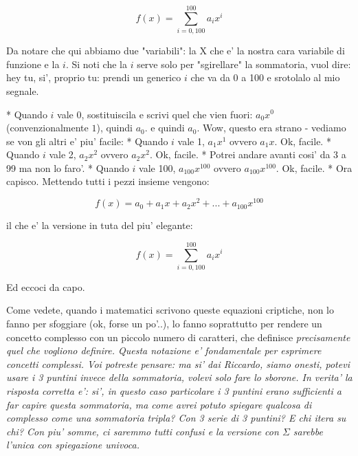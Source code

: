 \begin{equation}
  f(x)= \sum_{i=0,100}^100 a_i x^i 
\end{equation}

Da notare che qui abbiamo due "variabili": la X che e' la  nostra cara variabile di funzione e la $i$. Si noti che la $i$
serve solo per "sgirellare" la sommatoria, vuol dire: hey tu, si', proprio tu: prendi un generico $i$ che va da 0 a 100 e 
srotolalo al mio segnale. 

* Quando $i$ vale 0, sostituiscila e scrivi quel che vien fuori: $a_0 x^0$ (convenzionalmente $1$), quindi  $a_0$.
  e quindi $a_0$. Wow, questo era strano - vediamo se von gli altri e' piu' facile: 
* Quando $i$ vale 1, $a_1 x^1$ ovvero $a_1 x$. Ok, facile.
* Quando $i$ vale 2, $a_2 x^2$ ovvero $a_2 x^2$. Ok, facile.
* Potrei andare avanti cosi' da 3 a 99 ma non lo faro'.
* Quando $i$ vale 100, $a_100 x^100$ ovvero $a_100 x^100$. Ok, facile. 
* Ora capisco. Mettendo tutti i pezzi insieme vengono: 

\begin{equation}
  f(x)= a_0 + a_1 x + a_2 x^2 + ... + a_100 x^100
\end{equation}

il che e' la versione in tuta del piu' elegante: 

\begin{equation}
  f(x)= \sum_{i=0,100}^100 a_i x^i 
\end{equation}

Ed eccoci da capo.

Come vedete, quando i matematici scrivono queste equazioni criptiche, non lo fanno per sfoggiare (ok, forse un po'..),
lo fanno soprattutto per rendere un concetto complesso con un piccolo numero di caratteri, che definisce \em{precisamente}
quel che vogliono definire. Questa notazione e' fondamentale per esprimere concetti complessi. Voi potreste pensare: ma si'
dai Riccardo, siamo onesti, potevi usare i 3 puntini invece della sommatoria, volevi solo fare lo sborone. In verita' la
risposta corretta e': si', in questo caso particolare i 3 puntini erano sufficienti a far capire questa sommatoria, ma come
avrei potuto spiegare qualcosa di complesso come una sommatoria tripla? Con 3 serie di 3 puntini? E chi itera su chi? Con 
piu' somme, ci saremmo tutti confusi e la versione con $\varSigma$ sarebbe l'unica con spiegazione univoca.

